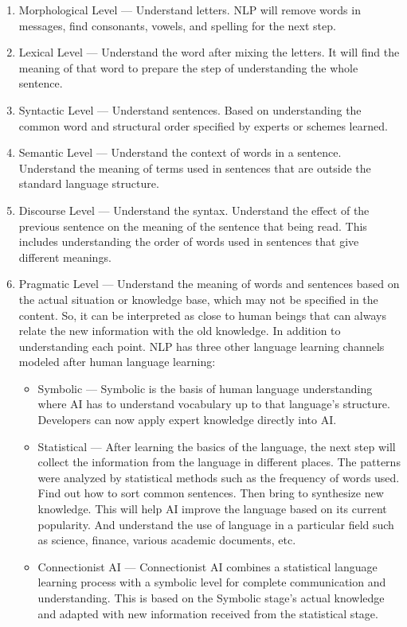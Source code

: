 \documentclass[12pt,oneside,openright,a4paper]{cpe-english-project}
\begin{document}
\begin{enumerate}
  \item Morphological Level — Understand letters. NLP will remove words in messages, find consonants,
  vowels, and spelling for the next step.
  \item Lexical Level — Understand the word after mixing the letters. It will find the meaning
  of that word to prepare the step of understanding the whole sentence.
  \item Syntactic Level — Understand sentences. Based on understanding the common word and structural
  order specified by experts or schemes learned.
  \item Semantic Level — Understand the context of words in a sentence. Understand the meaning of terms
  used in sentences that are outside the standard language structure.
  \item Discourse Level — Understand the syntax. Understand the effect of the previous sentence on the
  meaning of the sentence that being read. This includes understanding the order of words used in sentences
  that give different meanings.
  \item Pragmatic Level — Understand the meaning of words and sentences based on the actual situation
  or knowledge base, which may not be specified in the content. So, it can be interpreted as close to
  human beings that can always relate the new information with the old knowledge. In addition to
  understanding each point. NLP has three other language learning channels modeled after human language learning:
  \begin{itemize}
    \item Symbolic  — Symbolic is the basis of human language understanding where AI has to understand vocabulary up
    to that language's structure. Developers can now apply expert knowledge directly into AI.
    \item Statistical — After learning the basics of the language, the next step will collect the information
    from the language in different places. The patterns were analyzed by statistical methods such as the
    frequency of words used. Find out how to sort common sentences. Then bring to synthesize new knowledge.
    This will help AI improve the language based on its current popularity. And understand the use of language
    in a particular field such as science, finance, various academic documents, etc.
    \item Connectionist AI — Connectionist AI combines a statistical language learning process with a symbolic level for complete
    communication and understanding. This is based on the Symbolic stage's actual knowledge and adapted with new
    information received from the statistical stage.
    
  \end{itemize}
\end{enumerate}
\end{document}
